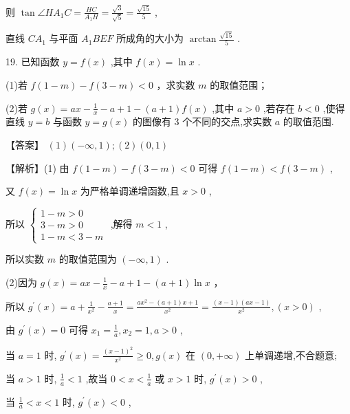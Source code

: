 \documentclass[10pt]{article}
\begin{document}
则 \(\tan \angle H{A}_{1}C = \frac{HC}{{A}_{1}H} = \frac{\sqrt{3}}{\sqrt{5}} = \frac{\sqrt{15}}{5}\) ,

直线 \(C{A}_{1}\) 与平面 \({A}_{1}{BEF}\) 所成角的大小为 \(\arctan \frac{\sqrt{15}}{5}\) .

19. 已知函数 \(y = f\left( x\right)\) ,其中 \(f\left( x\right)  = \ln x\) .

(1)若 \(f\left( {1 - m}\right)  - f\left( {3 - m}\right)  < 0\) ，求实数 \(m\) 的取值范围；

(2)若 \(g\left( x\right)  = {ax} - \frac{1}{x} - a + 1 - \left( {a + 1}\right) f\left( x\right)\) ,其中 \(a > 0\) ,若存在 \(b < 0\) ,使得直线 \(y = b\) 与函数 \(y = g\left( x\right)\) 的图像有 3 个不同的交点,求实数 \(a\) 的取值范围.

【答案】 \(\left( 1\right) \left( {-\infty ,1}\right) ;\left( 2\right) \left( {0,1}\right)\)

【解析】(1) 由 \(f\left( {1 - m}\right)  - f\left( {3 - m}\right)  < 0\) 可得 \(f\left( {1 - m}\right)  < f\left( {3 - m}\right)\) ,

又 \(f\left( x\right)  = \ln x\) 为严格单调递增函数,且 \(x > 0\) ,

所以 \(\left\{  \begin{array}{l} 1 - m > 0 \\  3 - m > 0 \\  1 - m < 3 - m \end{array}\right.\) ,解得 \(m < 1\) ,

所以实数 \(m\) 的取值范围为 \(\left( {-\infty ,1}\right)\) .

(2)因为 \(g\left( x\right)  = {ax} - \frac{1}{x} - a + 1 - \left( {a + 1}\right) \ln x\) ，

所以 \({g}^{\prime }\left( x\right)  = a + \frac{1}{{x}^{2}} - \frac{a + 1}{x} = \frac{a{x}^{2} - \left( {a + 1}\right) x + 1}{{x}^{2}} = \frac{\left( {x - 1}\right) \left( {{ax} - 1}\right) }{{x}^{2}},\left( {x > 0}\right)\) ,

由 \({g}^{\prime }\left( x\right)  = 0\) 可得 \({x}_{1} = \frac{1}{a},{x}_{2} = 1,a > 0\) ,

当 \(a = 1\) 时, \({g}^{\prime }\left( x\right)  = \frac{{\left( x - 1\right) }^{2}}{{x}^{2}} \geq  0,g\left( x\right)\) 在 \(\left( {0, + \infty }\right)\) 上单调递增,不合题意;

当 \(a > 1\) 时, \(\frac{1}{a} < 1\) ,故当 \(0 < x < \frac{1}{a}\) 或 \(x > 1\) 时, \({g}^{\prime }\left( x\right)  > 0\) ,

当 \(\frac{1}{a} < x < 1\) 时, \({g}^{\prime }\left( x\right)  < 0\) ,
\end{document}
